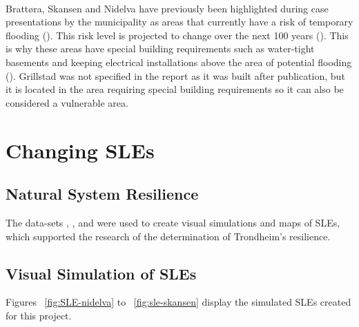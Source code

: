\paragraph{}

\paragraph{}
Brattøra, Skansen and Nidelva have previously been highlighted during case presentations by the municipality as areas that currently have a risk of temporary flooding (\cite{hanssen_saksframlegg_2013}). This risk level is projected to change over the next 100 years (\cite{hanssen-bauer_climate_2017}). This is why these areas have special building requirements such as water-tight basements and keeping electrical installations above the area of potential flooding (\cite{hanssen_saksframlegg_2013}). Grillstad was not specified in the report as it was built after publication, but it is located in the area requiring special building requirements so it can also be considered a vulnerable area. 

\section{Changing SLEs}




\subsection{ Natural System Resilience}

The data-sets  \cite{geonorge_stormflo_nodate} , \cite{kartverket_se_2021}, \cite{stormflo_database_stormflo_2021} and \cite{ipcc_sea_2021} were used to create visual simulations and maps of SLEs, which supported the research of the determination of Trondheim's resilience. 

\subsection{Visual Simulation of SLEs}
 Figures ~\ref{fig:SLE-nidelva} to ~\ref{fig:sle-skansen} display the simulated SLEs created for this project. 


